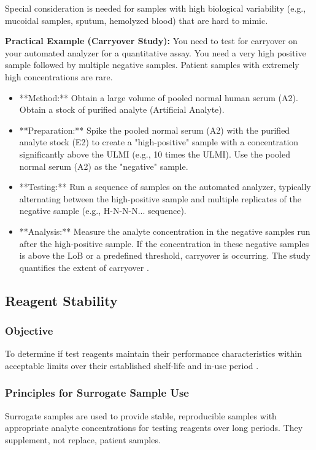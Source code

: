 \documentclass{article}
\begin{document}
Special consideration is needed for samples with high biological variability (e.g., mucoidal samples, sputum, hemolyzed blood) that are hard to mimic.

\textbf{Practical Example (Carryover Study):}
You need to test for carryover on your automated analyzer for a quantitative assay. You need a very high positive sample followed by multiple negative samples. Patient samples with extremely high concentrations are rare.
\begin{itemize}
    \item **Method:** Obtain a large volume of pooled normal human serum (A2). Obtain a stock of purified analyte (Artificial Analyte).
    \item **Preparation:** Spike the pooled normal serum (A2) with the purified analyte stock (E2) to create a "high-positive" sample with a concentration significantly above the ULMI (e.g., 10 times the ULMI). Use the pooled normal serum (A2) as the "negative" sample.
    \item **Testing:** Run a sequence of samples on the automated analyzer, typically alternating between the high-positive sample and multiple replicates of the negative sample (e.g., H-N-N-N... sequence).
    \item **Analysis:** Measure the analyte concentration in the negative samples run after the high-positive sample. If the concentration in these negative samples is above the LoB or a predefined threshold, carryover is occurring. The study quantifies the extent of carryover \cite{CLSIEP39Ed1E}.
\end{itemize}

\subsection{Reagent Stability}

\subsubsection{Objective}
To determine if test reagents maintain their performance characteristics within acceptable limits over their established shelf-life and in-use period \cite{CLSIEP25}.

\subsubsection{Principles for Surrogate Sample Use}
Surrogate samples are used to provide stable, reproducible samples with appropriate analyte concentrations for testing reagents over long periods. They supplement, not replace, patient samples.
\end{document}
